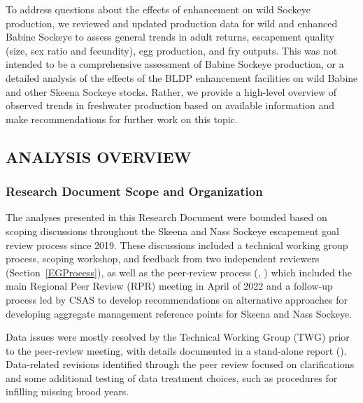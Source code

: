 \documentclass[french,11pt]{book}
\begin{document}
To address questions about the effects of enhancement on wild Sockeye production, we reviewed and updated production data for wild and enhanced Babine Sockeye to assess general trends in adult returns, escapement quality (size, sex ratio and fecundity), egg production, and fry outputs. This was not intended to be a comprehensive assessment of Babine Sockeye production, or a detailed analysis of the effects of the BLDP enhancement facilities on wild Babine and other Skeena Sockeye stocks. Rather, we provide a high-level overview of observed trends in freshwater production based on available information and make recommendations for further work on this topic.

\subsection{ANALYSIS OVERVIEW}\label{AnalysisOverview}

\subsubsection{Research Document Scope and Organization}\label{PaperScopeOrg}

The analyses presented in this Research Document were bounded based on scoping discussions throughout the Skeena and Nass Sockeye escapement goal review process since 2019. These discussions included a technical working group process, scoping workshop, and feedback from two independent reviewers (Section~\ref{EGProcess}), as well as the peer-review process (, ) which included the main Regional Peer Review (RPR) meeting in April of 2022 and a follow-up process led by CSAS to develop recommendations on alternative approaches for developing aggregate management reference points for Skeena and Nass Sockeye.

Data issues were mostly resolved by the Technical Working Group (TWG) prior to the peer-review meeting, with details documented in a stand-alone report (). Data-related revisions identified through the peer review focused on clarifications and some additional testing of data treatment choices, such as procedures for infilling missing brood years.
\end{document}

